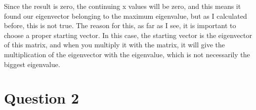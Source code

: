 \documentclass[11pt,a4paper, margin=1in]{article}
\begin{document}
\begin{enumerate}
    Since the result is zero, the continuing x values will be zero, and this means it found our eigenvector belonging to the maximum eigenvalue, but as I calculated before, this is not true. The reason for this, as far as I see, it is important to choose a proper starting vector. In this case, the starting vector is the eigenvector of this matrix, and when you multiply it with the matrix, it will give the multiplication of the eigenvector with the eigenvalue, which is not necessarily the biggest eigenvalue. 
 

\end{enumerate}


\section*{Question 2}
\end{document}
